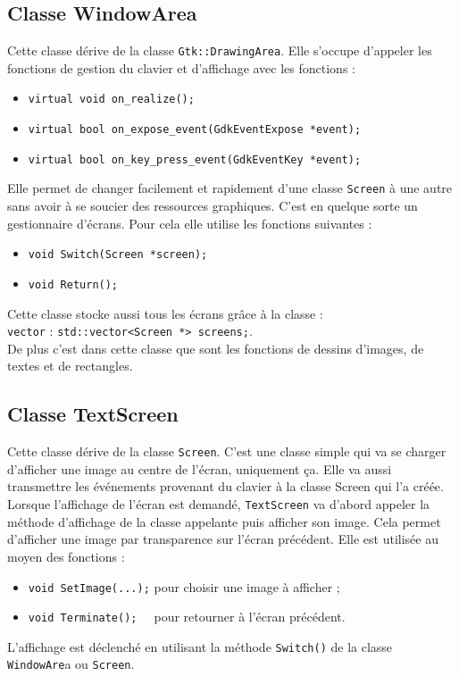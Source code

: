 \documentclass[a4paper,11pt,oneside]{article}
\begin{document}
\subsection{Classe WindowArea}
Cette classe dérive de la classe \verb|Gtk::DrawingArea|. Elle s'occupe d'appeler les fonctions de gestion du clavier et
d'affichage avec les fonctions :
\begin{itemize}
\item\verb|virtual void on_realize();|
\item\verb|virtual bool on_expose_event(GdkEventExpose *event);|
\item\verb|virtual bool on_key_press_event(GdkEventKey *event);|
\end{itemize}
Elle permet de changer facilement et rapidement d'une classe \verb|Screen| à une autre sans avoir à se soucier des
ressources graphiques. C'est en quelque sorte un gestionnaire d'écrans. Pour cela elle utilise les fonctions suivantes :
\begin{itemize}
\item\verb|void Switch(Screen *screen);|
\item\verb|void Return();|
\end{itemize}
Cette classe stocke aussi tous les écrans grâce à la classe :\\
\verb|vector| : \verb|std::vector<Screen *> screens;|.\\
De plus c'est dans cette classe que sont les fonctions de dessins d'images, de textes et de rectangles.

\subsection{Classe TextScreen}
Cette classe dérive de la classe \verb|Screen|. C'est une classe simple qui va se charger d'afficher une image au centre de l'écran,
uniquement ça. Elle va aussi transmettre les événements provenant du clavier à la classe Screen qui l'a créée. Lorsque l'affichage de
l'écran est demandé, \verb|TextScreen| va d'abord appeler la méthode d'affichage de la classe \og appelante\fg{} puis afficher son image.
Cela permet d'afficher une image par transparence sur l'écran précédent. Elle est utilisée au moyen des fonctions :
\begin{itemize}
\item\verb|void SetImage(...);| pour choisir une image à afficher ;
\item\verb|void Terminate();  | pour retourner à l'écran précédent.
\end{itemize}
L'affichage est déclenché en utilisant la méthode \verb|Switch()| de la classe \verb|WindowAre|a ou \verb|Screen|.
\end{document}
